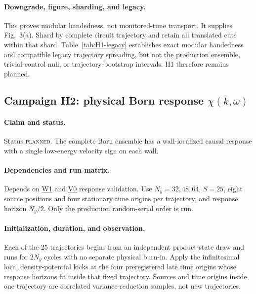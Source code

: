 \documentclass[aps,prx,twocolumn,floatfix,nofootinbib,superscriptaddress,longbibliography]{revtex4-2}
\newcommand{\planned}{\textsc{planned}}
\newcommand{\campref}[1]{\hyperref[camp:#1]{#1}}
\begin{document}
\paragraph*{Downgrade, figure, sharding, and legacy.}
This proves modular handedness, not monitored-time transport.  It supplies Fig.~3(a).
Shard by complete circuit trajectory and retain all translated cuts within that shard.
Table~\ref{tab:H1-legacy} establishes exact modular handedness and compatible legacy
trajectory spreading, but not the production ensemble, trivial-control null, or
trajectory-bootstrap intervals.  H1 therefore remains planned.

\clearpage
\subsection{Campaign H2: physical Born response \texorpdfstring{$\chi(k,\omega)$}{chi(k,omega)}}
\label{camp:H2}
\paragraph*{Claim and status.}
Status \planned.  The complete Born ensemble has a wall-localized causal response with a
single low-energy velocity sign on each wall.

\paragraph*{Dependencies and run matrix.}
Depends on \campref{W1} and \campref{V0} response validation.  Use $N_y=32,48,64$, $S=25$, eight source
positions and four stationary time origins per trajectory, and response horizon $N_y/2$.
Only the production random-serial order is run.

\paragraph*{Initialization, duration, and observation.}
Each of the 25 trajectories begins from an independent product-state draw and runs for
$2N_y$ cycles with no separate physical burn-in.  Apply the infinitesimal local
density-potential kicks at the four preregistered late time origins whose response horizons
fit inside that fixed trajectory.  Sources and time origins inside one trajectory are
correlated variance-reduction samples, not new trajectories.
\end{document}
